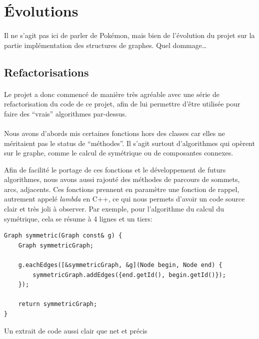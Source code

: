 \documentclass[french]{article}
\begin{document}
\section{Évolutions}

\paragraph{} Il ne s'agit pas ici de parler de Pokémon, mais bien de
l'évolution du projet sur la partie implémentation des structures de graphes.
Quel dommage\ldots

\subsection{Refactorisations}

\paragraph{} Le projet a donc commencé de manière très agréable avec une série
de refactorisation du code de ce projet, afin de lui permettre d'être utilisée
pour faire des ``vrais'' algorithmes par-dessus.

\paragraph{} Nous avons d'abords mis certaines fonctions hors des classes car
elles ne méritaient pas le status de ``méthodes''. Il s'agit surtout
d'algorithmes qui opèrent sur le graphe, comme le calcul de symétrique ou de
composantes connexes.

Afin de facilité le portage de ces fonctions et le développement de futurs
algorithmes, nous avons aussi rajouté des méthodes de parcours de sommets,
arcs, adjacents. Ces fonctions prennent en paramètre une fonction de rappel,
autrement appelé \emph{lambda} en C++, ce qui nous permets d'avoir un code
source clair et très joli à observer. Par exemple, pour l'algorithme du calcul
du symétrique, cela se résume à 4 lignes et un tiers:

\begin{listing}[H]
\begin{verbatim}
Graph symmetric(Graph const& g) {
	Graph symmetricGraph;

	g.eachEdges([&symmetricGraph, &g](Node begin, Node end) {
		symmetricGraph.addEdges({end.getId(), begin.getId()});
	});

	return symmetricGraph;
}
\end{verbatim}
\caption{Un extrait de code aussi clair que net et précis}
\label{tsp:symmetric}
\end{listing}
\end{document}
